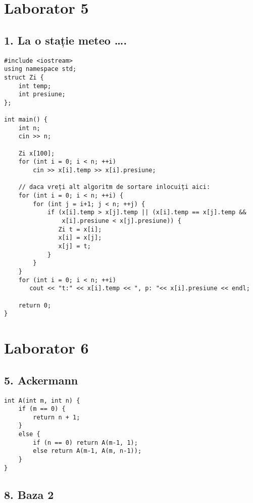 \documentclass[11pt]{article}
\begin{document}
\pagebreak

\section*{Laborator 5}
\label{sec:org5f72b82}
\subsection*{1. La o stație meteo \ldots{}.}
\label{sec:orgdd0cd8a}
\begin{verbatim}
#include <iostream>
using namespace std;
struct Zi {
    int temp;
    int presiune;
};

int main() {
    int n;
    cin >> n;

    Zi x[100];
    for (int i = 0; i < n; ++i)
        cin >> x[i].temp >> x[i].presiune;

    // daca vreți alt algoritm de sortare inlocuiți aici:
    for (int i = 0; i < n; ++i) {
        for (int j = i+1; j < n; ++j) {
            if (x[i].temp > x[j].temp || (x[i].temp == x[j].temp &&
                x[i].presiune < x[j].presiune)) {
               Zi t = x[i];
               x[i] = x[j];
               x[j] = t;
            }
        }
    }
    for (int i = 0; i < n; ++i)
       cout << "t:" << x[i].temp << ", p: "<< x[i].presiune << endl;

    return 0;
}
\end{verbatim}
\pagebreak

\section*{Laborator 6}
\label{sec:org7d7ac84}
\subsection*{5. Ackermann}
\label{sec:orged757dc}
\begin{verbatim}
int A(int m, int n) {
    if (m == 0) {
        return n + 1;
    }
    else {
        if (n == 0) return A(m-1, 1);
        else return A(m-1, A(m, n-1));
    }
}
\end{verbatim}

\subsection*{8. Baza 2}
\label{sec:org048a635}
\end{document}

